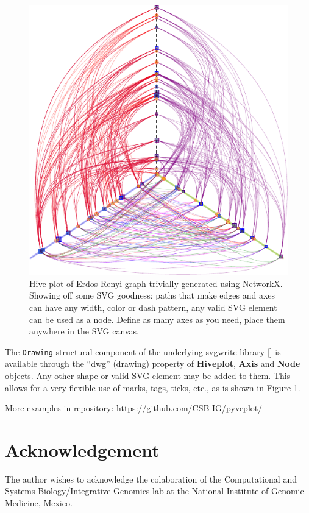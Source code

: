 \documentclass{bioinfo}
\begin{document}
\begin{figure}[h!]
  \centerline{\includegraphics[scale=0.7]{example.pdf}}
  \caption{Hive plot of Erdos-Renyi graph trivially generated using
    NetworkX. Showing off some SVG goodness: paths that make edges
    and axes can have any width, color or dash pattern, any valid SVG
    element can be used as a node. Define as many axes as you need,
    place them anywhere in the SVG canvas.}
  \label{fig:01}
\end{figure}

The \verb"Drawing" structural component of the underlying svgwrite
library [\cite{svgwrite}] is available through the ``dwg'' (drawing)
property of {\bfseries Hiveplot}, {\bfseries Axis} and {\bfseries
  Node} objects. Any other shape or valid SVG element may be added to
them. This allows for a very flexible use of marks, tags, ticks, etc.,
as is shown in Figure \ref{fig:01}.

More examples in repository: https://github.com/CSB-IG/pyveplot/



\section*{Acknowledgement}
The author wishes to acknowledge the colaboration of the Computational and Systems
Biology/Integrative Genomics lab at the National Institute of Genomic
Medicine, Mexico.



\end{document}
